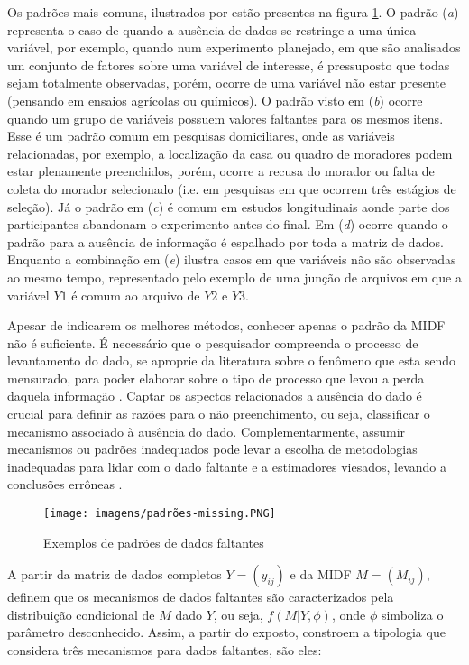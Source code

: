 Os padrões mais comuns, ilustrados por  estão presentes na figura \ref{fig:padrao_missing}. O padrão (\textit{a}) representa o caso de quando a ausência de dados se restringe a uma única variável, por exemplo, quando num experimento planejado, em que são analisados um conjunto de fatores sobre uma variável de interesse, é pressuposto que todas sejam totalmente observadas, porém, ocorre de uma variável não estar presente (pensando em ensaios agrícolas ou químicos). O padrão visto em (\textit{b}) ocorre quando um grupo de variáveis possuem valores faltantes para os mesmos itens. Esse é um padrão comum em pesquisas domiciliares, onde as variáveis relacionadas, por exemplo, a localização da casa ou quadro de moradores podem estar plenamente preenchidos, porém, ocorre a recusa do morador ou falta de coleta do morador selecionado (i.e. em pesquisas em que ocorrem três estágios de seleção). Já o padrão em (\textit{c}) é comum em estudos longitudinais aonde parte dos participantes abandonam o experimento antes do final. Em (\textit{d}) ocorre quando o padrão para a ausência de informação é espalhado por toda a matriz de dados. Enquanto a combinação em (\textit{e}) ilustra casos em que variáveis não são observadas ao mesmo tempo, representado pelo exemplo de uma junção de arquivos em que a variável $Y1$ é comum ao arquivo de $Y2$ e $Y3$.

Apesar de indicarem os melhores métodos, conhecer apenas o padrão da MIDF não é suficiente.  É necessário que o pesquisador compreenda o processo de levantamento do dado, se aproprie da literatura sobre o fenômeno que esta sendo mensurado, para poder elaborar sobre o tipo de processo que levou a perda daquela informação \cite{donders2006gentle}. Captar os aspectos relacionados a ausência do dado é crucial para definir as razões para o não preenchimento, ou seja, classificar o mecanismo associado à ausência do dado. Complementarmente, assumir mecanismos ou padrões inadequados pode levar a escolha de metodologias inadequadas para lidar com o dado faltante e a estimadores viesados, levando a conclusões errôneas \cite{ayilara2019impact}.      

\begin{figure}
    \centering
    \caption{Exemplos de padrões de dados faltantes}
    \texttt{[image: imagens/padrões-missing.PNG]}
    \label{fig:padrao_missing}
\end{figure}

A partir da matriz de dados completos $Y = (y_{ij})$ e da MIDF $M = (M_{ij})$,  definem que os mecanismos de dados faltantes são caracterizados pela distribuição condicional de $M$ dado $Y$, ou seja, $f(M|Y,\phi)$, onde $\phi$ simboliza o parâmetro desconhecido. Assim, a partir do exposto, \cite{Little2002-cv} constroem a tipologia que considera três mecanismos para dados faltantes, são eles: 


